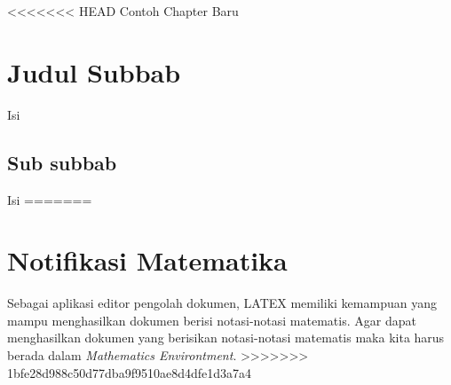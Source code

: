 <<<<<<< HEAD
Contoh Chapter Baru
\section{Judul Subbab}
Isi
\subsection{Sub subbab}
Isi
=======
\section{Notifikasi Matematika}
Sebagai aplikasi editor pengolah dokumen, LATEX memiliki kemampuan yang mampu menghasilkan dokumen berisi notasi-notasi matematis. Agar dapat menghasilkan dokumen yang berisikan notasi-notasi matematis maka kita harus berada dalam \textit{Mathematics Environtment}.
>>>>>>> 1bfe28d988c50d77dba9f9510ae8d4dfe1d3a7a4
